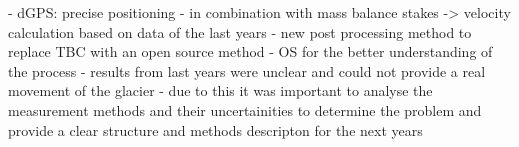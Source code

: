 - dGPS: precise positioning
- in combination with mass balance stakes -> velocity calculation based on data of the last years
- new post processing method to replace TBC with an open source method
- OS for the better understanding of the process
- results from last years were unclear and could not provide a real movement of the glacier
- due to this it was important to analyse the measurement methods and their uncertainities to determine the problem and provide a clear structure and methods descripton for the next years 